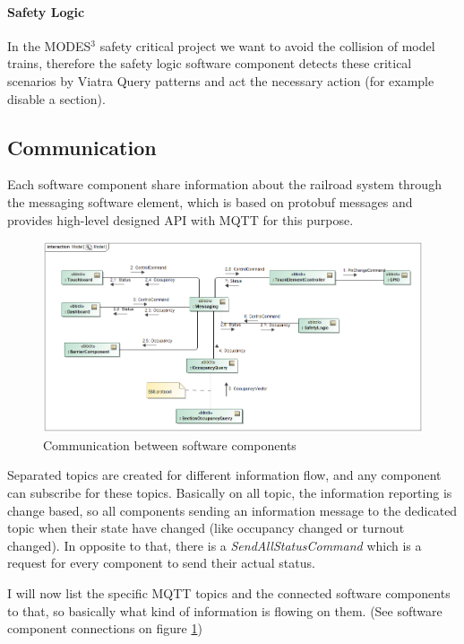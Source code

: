 \paragraph{Safety Logic}
In the MODES$^3$ safety critical project we want to avoid the collision of model trains, therefore the safety logic software component detects these critical scenarios by Viatra Query \cite{Viatra} patterns and act the necessary action (for example disable a section).

\subsection{Communication}
Each software component share information about the railroad system through the messaging software element, which is based on protobuf messages and provides high-level designed API with MQTT for this purpose. 
\begin{figure}[!h]
	\centering
	\includegraphics[width=150mm, keepaspectratio]{figures/modes3/CommunicationModel.png}
	\caption{Communication between software components}
	\label{fig:communicationModel}
\end{figure}

Separated topics are created for different information flow, and any component can subscribe for these topics. Basically on all topic, the information reporting is change based, so all components sending an information message to the dedicated topic when their state have changed (like occupancy changed or turnout changed). In opposite to that, there is a \textit{SendAllStatusCommand} which is a request for every component to send their actual status.

I will now list the specific MQTT topics and the connected software components to that, so basically what kind of information is flowing on them. (See software component connections on figure \ref{fig:communicationModel})

